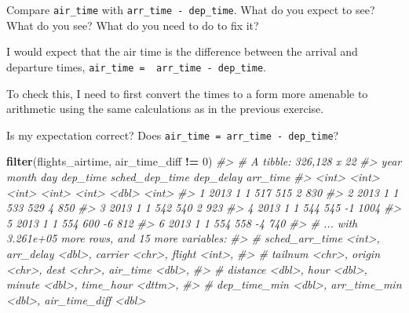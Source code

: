 \documentclass[]{book}
\newenvironment{Shaded}{\begin{snugshade}}{\end{snugshade}}
\newcommand{\CommentTok}[1]{\textcolor[rgb]{0.56,0.35,0.01}{\textit{#1}}}
\newcommand{\DataTypeTok}[1]{\textcolor[rgb]{0.13,0.29,0.53}{#1}}
\newcommand{\DecValTok}[1]{\textcolor[rgb]{0.00,0.00,0.81}{#1}}
\newcommand{\KeywordTok}[1]{\textcolor[rgb]{0.13,0.29,0.53}{\textbf{#1}}}
\newcommand{\NormalTok}[1]{#1}
\newcommand{\OperatorTok}[1]{\textcolor[rgb]{0.81,0.36,0.00}{\textbf{#1}}}
\newcommand{\StringTok}[1]{\textcolor[rgb]{0.31,0.60,0.02}{#1}}
\theoremstyle{plain}
\theoremstyle{remark}
\begin{document}
Compare \texttt{air\_time} with \texttt{arr\_time\ -\ dep\_time}. What do you expect to see? What do you see? What do you need to do to fix it?

I would expect that the air time is the difference between the arrival and departure times, \texttt{air\_time\ =\ \ arr\_time\ -\ dep\_time}.

To check this, I need to first convert the times to a form more amenable to arithmetic
using the same calculations as in the previous exercise.

\begin{Shaded}
\end{Shaded}

Is my expectation correct? Does \texttt{air\_time\ =\ arr\_time\ -\ dep\_time}?

\begin{Shaded}
\begin{Highlighting}[]
\KeywordTok{filter}\NormalTok{(flights_airtime, air_time_diff }\OperatorTok{!=}\StringTok{ }\DecValTok{0}\NormalTok{)}
\CommentTok{#> # A tibble: 326,128 x 22}
\CommentTok{#>    year month   day dep_time sched_dep_time dep_delay arr_time}
\CommentTok{#>   <int> <int> <int>    <int>          <int>     <dbl>    <int>}
\CommentTok{#> 1  2013     1     1      517            515         2      830}
\CommentTok{#> 2  2013     1     1      533            529         4      850}
\CommentTok{#> 3  2013     1     1      542            540         2      923}
\CommentTok{#> 4  2013     1     1      544            545        -1     1004}
\CommentTok{#> 5  2013     1     1      554            600        -6      812}
\CommentTok{#> 6  2013     1     1      554            558        -4      740}
\CommentTok{#> # ... with 3.261e+05 more rows, and 15 more variables:}
\CommentTok{#> #   sched_arr_time <int>, arr_delay <dbl>, carrier <chr>, flight <int>,}
\CommentTok{#> #   tailnum <chr>, origin <chr>, dest <chr>, air_time <dbl>,}
\CommentTok{#> #   distance <dbl>, hour <dbl>, minute <dbl>, time_hour <dttm>,}
\CommentTok{#> #   dep_time_min <dbl>, arr_time_min <dbl>, air_time_diff <dbl>}
\end{Highlighting}
\end{Shaded}
\end{document}
